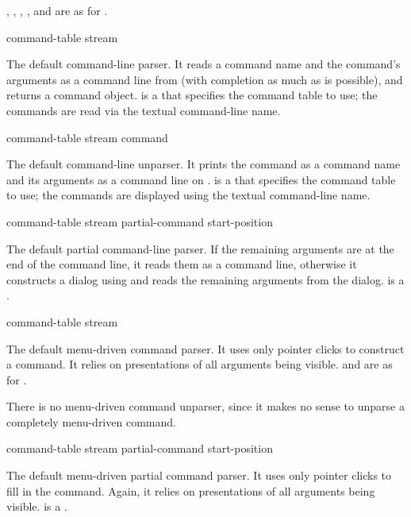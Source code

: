 , , , ,
and  are as for .


 {command-table stream}

The default command-line parser.  It reads a command name and the command's
arguments as a command line from  (with completion as much as is
possible), and returns a command object.   is a  that specifies the command table to use; the commands are read
via the textual command-line name.

 {command-table stream command}

The default command-line unparser.  It prints the command  as a
command name and its arguments as a command line on .
 is a  that specifies the
command table to use; the commands are displayed using the textual command-line
name.

       {command-table stream partial-command start-position}

The default partial command-line parser.  If the remaining arguments are at the
end of the command line, it reads them as a command line, otherwise it
constructs a dialog using  and reads the remaining
arguments from the dialog.   is a . 

 {command-table stream}

The default menu-driven command parser.  It uses only pointer clicks to
construct a command.  It relies on presentations of all arguments being visible.
 and  are as for .

There is no menu-driven command unparser, since it makes no sense to unparse a
completely menu-driven command.

       {command-table stream partial-command start-position}

The default menu-driven partial command parser.  It uses only pointer clicks to
fill in the command.  Again, it relies on presentations of all arguments being
visible.   is a .



